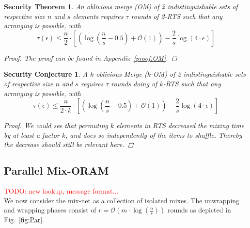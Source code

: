 \documentclass{llncs}
\newtheorem{secthm}{Security Theorem}
\newtheorem{seccjt}{Security Conjecture}
\newcommand{\todo}[1]{\textcolor{red}{TODO: #1}}
\begin{document}
\begin{secthm}
An oblivious merge (OM) of 2 indistinguishable sets of respective size $n$ and $s$ elements requires $\tau$ rounds of 2-RTS such that any arranging is possible, with
$$\tau(\epsilon) \leq \frac{n}{2}  \cdot \left [ \left( \log \left (\frac{n}{s}-0.5\right) +\mathcal{O}\left(1\right) \right ) - \frac{2}{s} \log \left( 4 \cdot \epsilon\right) \right ] $$%
\begin{proof}
The proof can be found in Appendix~\ref{proof:OM}.
\end{proof}
\end{secthm}

\begin{seccjt}
A $k$-oblivious Merge ($k$-OM) of 2 indistinguishable sets of respective size $n$ and $s$ requires $\tau$ rounds doing of $k$-RTS such that any arranging is possible, with
$$ \tau(\epsilon) \leq \frac{n}{2\cdot k}  \cdot \left [ \left( \log \left (\frac{n}{s}-0.5\right) +\mathcal{O}\left(1\right) \right ) - \frac{2}{s} \log \left( 4 \cdot \epsilon\right) \right ] $$
\begin{proof}
We could see that permuting $k$ elements in RTS decreased the mixing time by at least a factor $k$, and does so independently of the items to shuffle. Thereby the decrease should still be relevant here.
\end{proof}
\end{seccjt}
%
\subsection{Parallel Mix-ORAM}\label{parallelMixORAM}
\todo{new lookup, message format... \\}
%
We now consider the mix-net as a collection of isolated mixes. The unwrapping and wrapping phases consist of $r=\mathcal{O}\left ( m \cdot \log \left (\frac{n}{s} \right ) \right )$ rounds as depicted in Fig.~\ref{fig:Par}.\\
\end{document}

